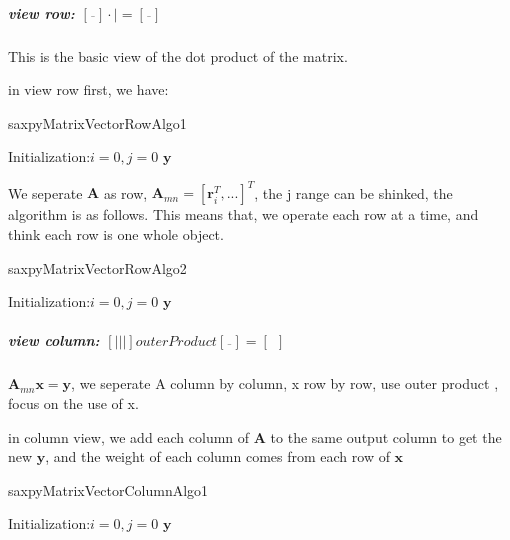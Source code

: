 \documentclass[UTF8]{../../09-Mathematics}
\begin{document}


\subparagraph{view row: $ [\overline{\ \ } ] \cdot | =  [\overline{\ \ } ]$}

This is the basic view of the dot product of the matrix.

in view row first, we have:

\begin{algorithm}[H]
    \caption{saxpyMatrixVectorRowAlgo1}\label{algo:saxpyMatrixVectorRowAlgo1}
    \SetAlgoLined
    Initialization:$i=0,j=0$\;
    \KwRet $\boldsymbol y$\;
\end{algorithm}


We seperate $  \boldsymbol A $ as row, $  \boldsymbol A_{mn} = [\boldsymbol r_{i}^T,...] ^T$, the j range can be shinked, the algorithm is as follows. This means that, we operate each row at a time, and think each row is one whole object.

\begin{algorithm}[H]
    \caption{saxpyMatrixVectorRowAlgo2}\label{algo:saxpyMatrixVectorRowAlgo2}
    \SetAlgoLined
    Initialization:$i=0,j=0$\;
    \KwRet $\boldsymbol y$\;
\end{algorithm}




\subparagraph{view column: $ [|||]  outerProduct [\overline{\ \ } ] =  [ \ \ ]$}



$\boldsymbol A_{mn} \boldsymbol x = \boldsymbol y $, we seperate A column by column, x row by row, use outer product , focus on the use of x.


in column view, we add each column of $\boldsymbol A$ to the same output column to get the new $\boldsymbol y$, and the weight of each column comes from each row of  $\boldsymbol x$

\begin{algorithm}[H]
    \caption{saxpyMatrixVectorColumnAlgo1}\label{algo:saxpyMatrixVectorColumnAlgo1}
    \SetAlgoLined
    Initialization:$i=0,j=0$\;
    \KwRet $\boldsymbol y$\;
\end{algorithm}
\end{document}
